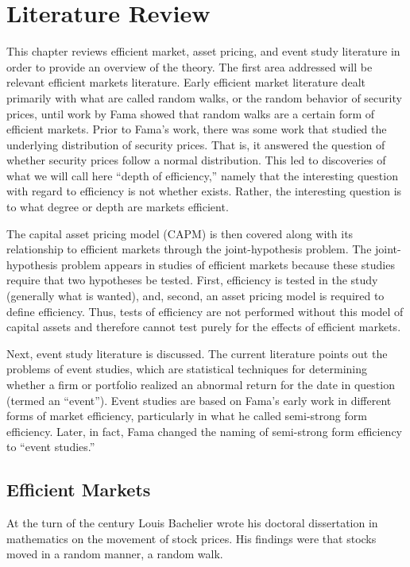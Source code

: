 \chapter{Literature Review}\label{litrev}

This chapter reviews efficient market, asset pricing, and event study literature in order to provide an overview of the theory. The first area addressed will be relevant efficient markets literature. Early efficient market literature dealt primarily with what are called random walks, or the random behavior of security prices, until work by Fama showed that random walks are a certain form of efficient markets. Prior to Fama's work, there was some work that studied the underlying distribution of security prices. That is, it answered the question of whether security prices follow a normal distribution. This led to discoveries of what we will call here ``depth of efficiency,'' namely that the interesting question with regard to efficiency is not whether exists. Rather, the interesting question is to what degree or depth are markets efficient.

The capital asset pricing model (CAPM) is then covered along with its relationship to efficient markets through the joint-hypothesis problem. The joint-hypothesis problem appears in studies of efficient markets because these studies require that two hypotheses be tested. First, efficiency is tested in the study (generally what is wanted), and, second, an asset pricing model is required to define efficiency. Thus, tests of efficiency are not performed without this model of capital assets and therefore cannot test purely for the effects of efficient markets.

Next, event study literature is discussed. The current literature points out the problems of event studies, which are statistical techniques for determining whether a firm or portfolio realized an abnormal return for the date in question (termed an ``event''). Event studies are based on Fama's early work in different forms of market efficiency, particularly in what he called semi-strong form efficiency. Later, in fact, Fama changed the naming of semi-strong form efficiency to ``event studies.''

\section{Efficient Markets}

At the turn of the century Louis Bachelier \cite{bachelier} wrote his doctoral dissertation in mathematics on the movement of stock prices. His findings were that stocks moved in a random manner, a random walk.

